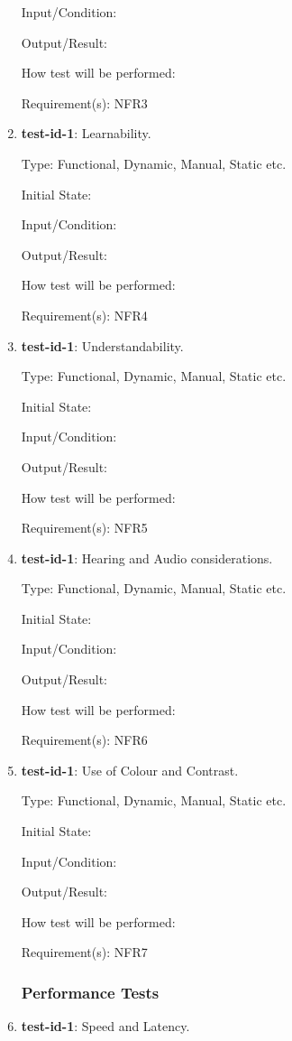 \documentclass[12pt, titlepage]{article}
\begin{document}
\begin{enumerate}
		Input/Condition: 
		
		Output/Result: 
		
		How test will be performed: 
		
		Requirement(s): NFR3
		
		\item{\textbf{test-id-1}}: Learnability.
		
		Type: Functional, Dynamic, Manual, Static etc.
		
		Initial State: 
		
		Input/Condition: 
		
		Output/Result: 
		
		How test will be performed: 
		
		Requirement(s): NFR4
		
		\item{\textbf{test-id-1}}: Understandability.
		
		Type: Functional, Dynamic, Manual, Static etc.
		
		Initial State: 
		
		Input/Condition: 
		
		Output/Result: 
		
		How test will be performed: 
		
		Requirement(s): NFR5
		
		\item{\textbf{test-id-1}}: Hearing and Audio considerations.
		
		Type: Functional, Dynamic, Manual, Static etc.
		
		Initial State: 
		
		Input/Condition: 
		
		Output/Result: 
		
		How test will be performed: 
		
		Requirement(s): NFR6
		
		\item{\textbf{test-id-1}}: Use of Colour and Contrast.
		
		Type: Functional, Dynamic, Manual, Static etc.
		
		Initial State: 
		
		Input/Condition: 
		
		Output/Result: 
		
		How test will be performed: 
		
		Requirement(s): NFR7
	\subsubsection{Performance Tests}
		\item{\textbf{test-id-1}}: Speed and Latency.
		

\end{enumerate}
\end{document}
